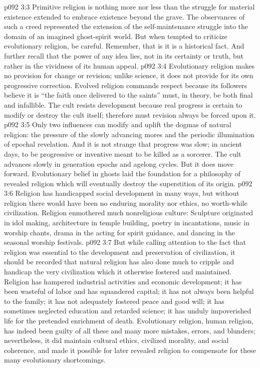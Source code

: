 \pc \vs p092 3:3 Primitive religion is nothing more nor less than the struggle for material existence extended to embrace existence beyond the grave. The observances of such a creed represented the extension of the self\hyp{}maintenance struggle into the domain of an imagined ghost\hyp{}spirit world. But when tempted to criticize evolutionary religion, be careful. Remember, that is  it is a historical fact. And further recall that the power of any idea lies, not in its certainty or truth, but rather in the vividness of its human appeal.\plusone
\pc \vs p092 3:4 Evolutionary religion makes no provision for change or revision; unlike science, it does not provide for its own progressive correction. Evolved religion commands respect because its followers believe it is  “the faith once delivered to the saints” must, in theory, be both final and infallible. The cult resists development because real progress is certain to modify or destroy the cult itself; therefore must revision always be forced upon it.
\vs p092 3:5 Only two influences can modify and uplift the dogmas of natural religion: the pressure of the slowly advancing mores and the periodic illumination of epochal revelation. And it is not strange that progress was slow; in ancient days, to be progressive or inventive meant to be killed as a sorcerer. The cult advances slowly in generation epochs and agelong cycles. But it does move forward. Evolutionary belief in ghosts laid the foundation for a philosophy of revealed religion which will eventually destroy the superstition of its origin.
\vs p092 3:6 Religion has handicapped social development in many ways, but without religion there would have been no enduring morality nor ethics, no worth\hyp{}while civilization. Religion enmothered much nonreligious culture: Sculpture originated in idol making, architecture in temple building, poetry in incantations, music in worship chants, drama in the acting for spirit guidance, and dancing in the seasonal worship festivals.
\vs p092 3:7 But while calling attention to the fact that religion was essential to the development and preservation of civilization, it should be recorded that natural religion has also done much to cripple and handicap the very civilization which it otherwise fostered and maintained. Religion has hampered industrial activities and economic development; it has been wasteful of labor and has squandered capital; it has not always been helpful to the family; it has not adequately fostered peace and good will; it has sometimes neglected education and retarded science; it has unduly impoverished life for the pretended enrichment of death. Evolutionary religion, human religion, has indeed been guilty of all these and many more mistakes, errors, and blunders; nevertheless, it did maintain cultural ethics, civilized morality, and social coherence, and made it possible for later revealed religion to compensate for these many evolutionary shortcomings.
